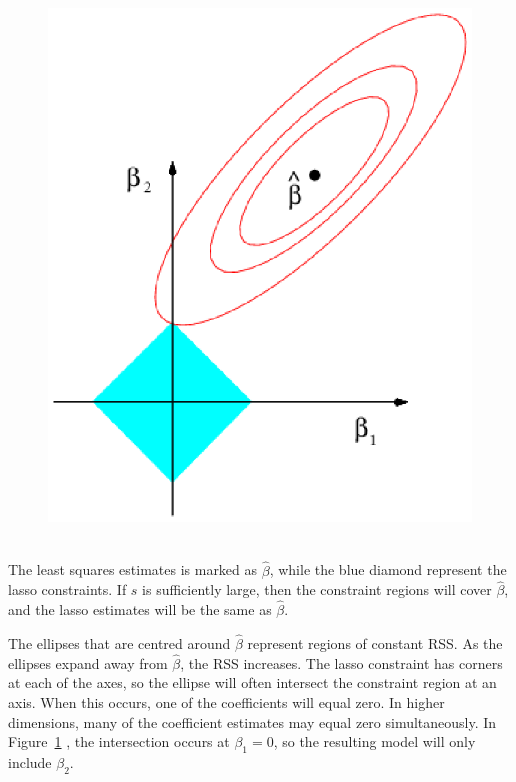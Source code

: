 \documentclass[12pt,a4paper]{article}%
\theoremstyle{definition}
\theoremstyle{plain}
\numberwithin{equation}{section}
\newcounter{subsubsubsection}[subsubsection]
\begin{document}
\subsubsubsection{\textcolor{blue}{The Variable Selection Property of the Lasso}}
\begin{figure}[H]
\centering
\includegraphics[scale=0.8]{images//6_7.eps}
\\~\\
\caption{ }\label{lassoOpti}
\end{figure}

The least squares estimates is marked as $\hat{\beta}$, while the blue diamond represent the lasso constraints. 
If $s$ is sufficiently large, then the constraint regions will cover $\hat{\beta}$, and the lasso estimates will be the same as $\hat{\beta}$. 

The ellipses that are centred around $\hat{\beta}$ represent regions of constant RSS. As the ellipses expand away from $\hat{\beta}$, the RSS increases. 
The lasso constraint has corners at each of the axes, so the ellipse will often intersect the constraint region at an axis. When this occurs, one of the coefficients will equal zero. 
In higher dimensions, many of the coefficient estimates may equal zero simultaneously. 
In Figure~\ref{lassoOpti} , the intersection occurs at $\beta_{1}=0$, so the resulting model will only include $\beta_{2}$.
\end{document}
